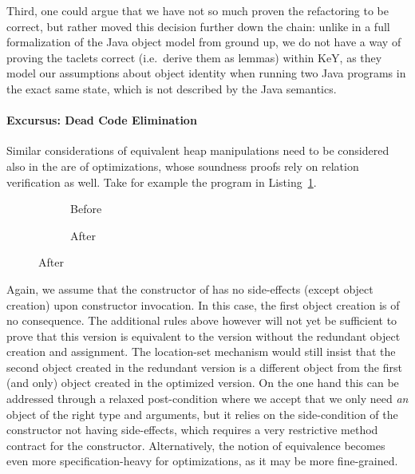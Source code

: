 Third, one could argue that we have not so much proven the refactoring to be correct,
but rather moved this decision further down the chain: unlike in a full formalization of the Java object model from ground up, 
we do not have a way of proving the taclets correct (i.e.\ derive them as lemmas) within KeY, as they model our assumptions about object identity when running two Java programs in the exact same state, which is not described by the Java semantics.


\paragraph*{Excursus: Dead Code Elimination}
Similar considerations of equivalent heap manipulations need to be considered also in the are of optimizations, whose soundness proofs rely on relation verification as well.
Take for example the program in Listing~\ref{lst:xisnewxisnew}.
\begin{figure}
  \centering
  \begin{subfigure}[b]{.2\linewidth}
    
    \caption{Before}
  \end{subfigure}\hspace{1cm}
  \begin{subfigure}[b]{.2\linewidth}
    
    \caption{After}
  \end{subfigure}
\label{lst:xisnewxisnew}
\end{figure}

Again, we assume that the constructor of  has no side-effects (except object creation) upon constructor invocation.
In this case, the first object creation is of no consequence.
The additional rules above however will not yet be sufficient to prove that this version is equivalent to the version without the redundant object creation and assignment.
The location-set mechanism would still insist that the second object created  in the redundant version is a different object from the first (and only) object created in the optimized version.
On the one hand this can be addressed through a relaxed post-condition where we accept that we only need \textit{an} object of the right type and arguments, but it relies on the side-condition of the constructor not having side-effects, which requires a very restrictive method contract for the constructor.
Alternatively, the notion of equivalence becomes even more specification-heavy for optimizations, as it may be more fine-grained. 

